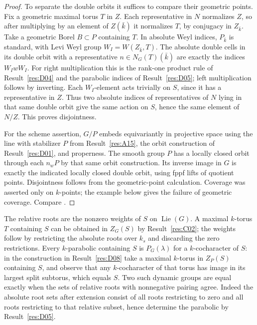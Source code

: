 \documentclass[11pt,a4paper,openany,oneside]{book}
\theoremstyle{resultstyle}
\theoremstyle{definition}
\numberwithin{equation}{chapter}
\DeclareMathOperator{\Lie}{Lie}
\begin{document}
\begin{proof}
To separate the double orbits it suffices to compare
their geometric points. Fix a geometric maximal torus
\(T\) in \(Z\). Each representative in \(N\) normalizes
\(Z\), so after multiplying by an element of \(Z(\bar k)\)
it normalizes \(T\), by conjugacy in \(Z_{\bar k}\).
Take a geometric Borel \(B\subset P\) containing \(T\).
In absolute Weyl indices, \(P_{\bar k}\) is standard,
with Levi Weyl group \(W_I=W(Z_{\bar k},T)\).
The absolute double cells in its double orbit with a
representative \(n\in N_G(T)(\bar k)\) are exactly the
indices \(W_I w W_I\). For right multiplication this
is the rank-one product rule of Result~\ref{res:D04}
and the parabolic indices of Result~\ref{res:D05};
left multiplication follows by inverting. Each
\(W_I\)-element acts trivially on \(S\), since it has
a representative in \(Z\). Thus two absolute indices
of representatives of \(N\) lying in that same double
orbit give the same action on \(S\), hence the same
element of \(N/Z\). This proves disjointness.

For the scheme assertion, \(G/P\) embeds equivariantly
in projective space using the line with stabilizer \(P\)
from Result~\ref{res:A15}, the orbit construction of
Result~\ref{res:D01}, and properness. The smooth group
\(P\) has a locally closed orbit through each \(n_wP\)
by that same orbit construction. Its inverse image in
\(G\) is exactly the indicated locally closed double
orbit, using fppf lifts of quotient points.
Disjointness follows from the geometric-point calculation.
Coverage was asserted only on \(k\)-points; the example
below gives the failure of geometric coverage.
Compare \cite[Theorem 10.3.1 and Appendix P]{conradfeng}.
\end{proof}

The relative roots are the nonzero weights of \(S\) on
\(\Lie(G)\). A maximal \(k\)-torus \(T\) containing \(S\)
can be obtained in \(Z_G(S)\) by Result~\ref{res:C02};
the weights follow by restricting the absolute roots over
\(k_s\) and discarding the zero restrictions.
Every \(k\)-parabolic containing \(S\) is \(P_G(\lambda)\)
for a \(k\)-cocharacter of \(S\): in the construction in
Result~\ref{res:D08} take a maximal \(k\)-torus in
\(Z_P(S)\) containing \(S\), and observe that any
\(k\)-cocharacter of that torus has image in its largest
split subtorus, which equals \(S\).
Two such dynamic groups are equal exactly when the sets
of relative roots with nonnegative pairing agree.
Indeed the absolute root sets after extension consist of
all roots restricting to zero and all roots restricting
to that relative subset, hence determine the parabolic
by Result~\ref{res:D05}.
\end{document}
